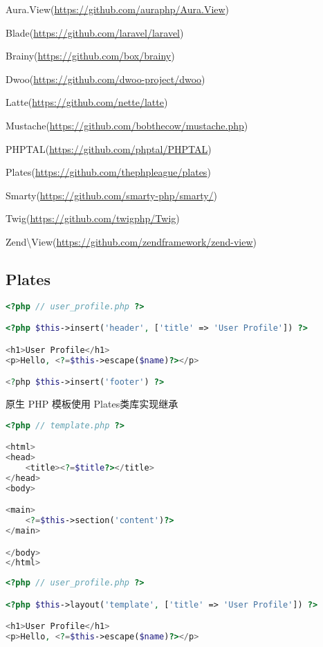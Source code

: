 \begin{compactitem}
\item Aura.View(\url{https://github.com/auraphp/Aura.View})
\item Blade(\url{https://github.com/laravel/laravel})
\item Brainy(\url{https://github.com/box/brainy})
\item Dwoo(\url{https://github.com/dwoo-project/dwoo})
\item Latte(\url{https://github.com/nette/latte})
\item Mustache(\url{https://github.com/bobthecow/mustache.php})
\item PHPTAL(\url{https://github.com/phptal/PHPTAL})
\item Plates(\url{https://github.com/thephpleague/plates})
\item Smarty(\url{https://github.com/smarty-php/smarty/})
\item Twig(\url{https://github.com/twigphp/Twig})
\item Zend\textbackslash View(\url{https://github.com/zendframework/zend-view})
\end{compactitem}

\subsection{Plates}

\begin{lstlisting}[language=PHP]
<?php // user_profile.php ?>

<?php $this->insert('header', ['title' => 'User Profile']) ?>

<h1>User Profile</h1>
<p>Hello, <?=$this->escape($name)?></p>

<?php $this->insert('footer') ?>
\end{lstlisting}

\begin{example}
原生 PHP 模板使用 Plates类库实现继承
\begin{lstlisting}[language=PHP]
<?php // template.php ?>

<html>
<head>
    <title><?=$title?></title>
</head>
<body>

<main>
    <?=$this->section('content')?>
</main>

</body>
</html>
\end{lstlisting}
\end{example}

\begin{lstlisting}[language=PHP]
<?php // user_profile.php ?>

<?php $this->layout('template', ['title' => 'User Profile']) ?>

<h1>User Profile</h1>
<p>Hello, <?=$this->escape($name)?></p>
\end{lstlisting}

